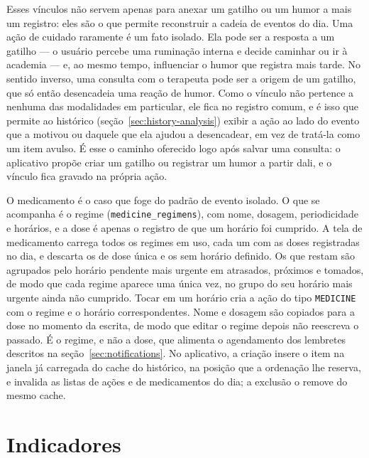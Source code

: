 Esses vínculos não servem apenas para anexar um gatilho ou um humor a mais
um registro: eles são o que permite reconstruir a cadeia de eventos do
dia. Uma ação de cuidado raramente é um fato isolado. Ela pode ser a
resposta a um gatilho --- o usuário percebe uma ruminação interna e decide
caminhar ou ir à academia --- e, ao mesmo tempo, influenciar o humor que
registra mais tarde. No sentido inverso, uma consulta com o terapeuta pode
ser a origem de um gatilho, que só então desencadeia uma reação de humor.
Como o vínculo não pertence a nenhuma das modalidades em particular, ele
fica no registro comum, e é isso que permite ao histórico
(seção~\ref{sec:history-analysis}) exibir a ação ao lado do evento que a
motivou ou daquele que ela ajudou a desencadear, em vez de tratá-la como
um item avulso. É esse o caminho oferecido logo após salvar uma consulta:
o aplicativo propõe criar um gatilho ou registrar um humor a partir dali,
e o vínculo fica gravado na própria ação.

O medicamento é o caso que foge do padrão de evento isolado. O que se
acompanha é o regime (\texttt{medicine\_regimens}), com nome, dosagem,
periodicidade e horários, e a dose é apenas o registro de que um horário
foi cumprido. A tela de medicamento carrega todos os regimes em uso, cada
um com as doses registradas no dia, e descarta os de dose única e os sem
horário definido. Os que restam são agrupados pelo horário pendente mais
urgente em atrasados, próximos e tomados, de modo que cada regime aparece
uma única vez, no grupo do seu horário mais urgente ainda não cumprido.
Tocar em um horário cria a ação do tipo \texttt{MEDICINE} com o regime e o
horário correspondentes. Nome e dosagem são copiados para a dose no momento
da escrita, de modo que editar o regime depois não reescreva o passado. É o
regime, e não a dose, que alimenta o agendamento dos lembretes descritos na
seção~\ref{sec:notifications}. No aplicativo, a criação insere o item na
janela já carregada do cache do histórico, na posição que a ordenação lhe
reserva, e invalida as listas de ações e de medicamentos do dia; a exclusão
o remove do mesmo cache.

\section{Indicadores}\label{sec:insights}

